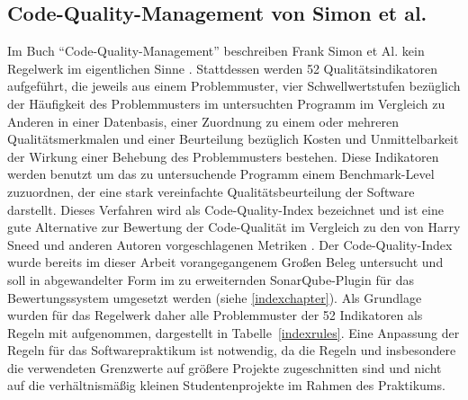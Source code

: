 \documentclass[da,ngerman]{stthesis}
\begin{document}
			\subsection{Code-Quality-Management von Simon et al.}
				Im Buch "`Code-Quality-Management"' beschreiben Frank Simon et Al. kein Regelwerk im eigentlichen Sinne \cite{CodeQualityManagement}. Stattdessen werden 52 Qualitätsindikatoren aufgeführt, die jeweils aus einem Problemmuster, vier Schwellwertstufen bezüglich der Häufigkeit des Problemmusters im untersuchten Programm im Vergleich zu Anderen in einer Datenbasis, einer Zuordnung zu einem oder mehreren Qualitätsmerkmalen und einer Beurteilung bezüglich Kosten und Unmittelbarkeit der Wirkung einer Behebung des Problemmusters bestehen. Diese Indikatoren werden benutzt um das zu untersuchende Programm einem Benchmark-Level zuzuordnen, der eine stark vereinfachte Qualitätsbeurteilung der Software darstellt. Dieses Verfahren wird als Code-Quality-Index bezeichnet und ist eine gute Alternative zur Bewertung der Code-Qualität im Vergleich zu den von Harry Sneed und anderen Autoren vorgeschlagenen Metriken \cite{SoftwareInZahlen}. \newline
				Der Code-Quality-Index wurde bereits im dieser Arbeit vorangegangenem Großen Beleg untersucht \cite{grosserBeleg} und soll in abgewandelter Form im zu erweiternden SonarQube-Plugin für das Bewertungssystem umgesetzt werden (siehe \ref{indexchapter}). Als Grundlage wurden für das Regelwerk daher alle Problemmuster der 52 Indikatoren als Regeln mit aufgenommen, dargestellt in Tabelle~\ref{indexrules}. Eine Anpassung der Regeln für das Softwarepraktikum ist notwendig, da die Regeln und insbesondere die verwendeten Grenzwerte auf größere Projekte zugeschnitten sind und nicht auf die verhältnismäßig kleinen Studentenprojekte im Rahmen des Praktikums. 
\end{document}
